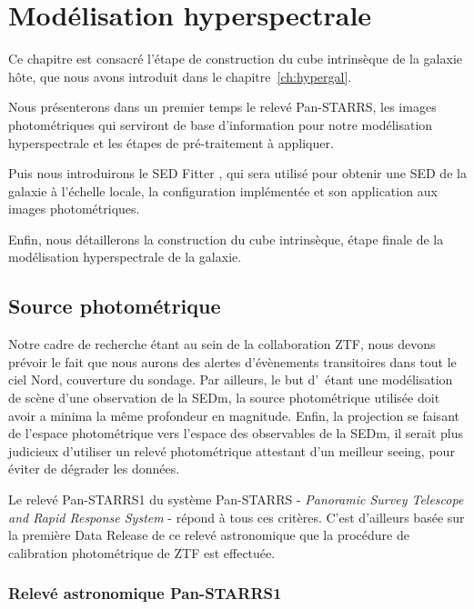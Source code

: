 \documentclass[../main/main.tex]{subfiles}
\begin{document}
\setcounter{chapter}{5}
\chapter{Modélisation hyperspectrale}\label{ch:modelhyperspec}

\minitoc
\vspace{2cm}
Ce chapitre est consacré l'étape de construction du cube intrinsèque de
la galaxie hôte, que nous avons introduit dans le
chapitre~\ref{ch:hypergal}.

Nous présenterons dans un premier temps le relevé Pan-STARRS, les images photométriques
qui serviront de base d'information pour notre modélisation hyperspectrale et les
étapes de pré-traitement à appliquer.

Puis nous introduirons le SED Fitter , qui sera utilisé pour
obtenir une SED de la galaxie à l'échelle locale, la configuration
implémentée et son application aux images photométriques.

Enfin, nous détaillerons la construction du cube intrinsèque, étape
finale de la modélisation hyperspectrale de la galaxie.
\newpage

\section{Source photométrique}
\label{sec:photosource}

Notre cadre de recherche étant au sein de la collaboration ZTF, nous
devons prévoir le fait que nous aurons des alertes d'évènements
transitoires dans tout le ciel Nord, couverture du sondage. Par
ailleurs, le but d'\hypergal\ étant une modélisation de scène d'une
observation de la SEDm, la source photométrique utilisée doit avoir a
minima la même profondeur en magnitude. Enfin, la projection se faisant
de l'espace photométrique vers l'espace des observables de la SEDm, il
serait plus judicieux d'utiliser un relevé photométrique attestant d'un
meilleur seeing, pour éviter de dégrader les données.

Le relevé Pan-STARRS1 du système Pan-STARRS - \textit{Panoramic Survey Telescope and Rapid
Response System} - \citep{Kaiser2002,Kaiser2010} répond à tous ces critères. C'est d'ailleurs basée sur
la première Data Release de ce relevé astronomique \citep{ChambersPanstarrs,Flewelling2020} que la procédure de calibration photométrique
de ZTF est effectuée.

\subsection{Relevé astronomique Pan-STARRS1}
\label{ssec:ps1}
\end{document}
